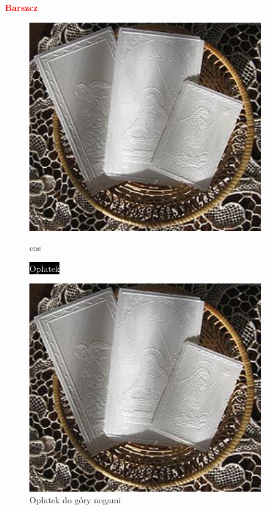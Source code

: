 \documentclass[11pt]{book}
\begin{document}
\textbf{\textcolor{red}{\LARGE Barszcz}}

\tab
\tab

\begin{figure}[ht]
\begin{center}
\includegraphics[width=100mm,height=!]{oplatek.jpeg}
\caption{\colorbox{black}{\textcolor{white}{\LARGE Opłatek}}}{cos}
\label{rys_model}
\end{center}
\end{figure}

\tab
\tab

\begin{figure}
\centering
\includegraphics[width=10cm, angle=180]{oplatek.jpeg}
\caption{Opłatek do góry nogami}
\label{fig:obrazek}
\end{figure}

\tab
\tab

\tab
\tab
\end{document}
